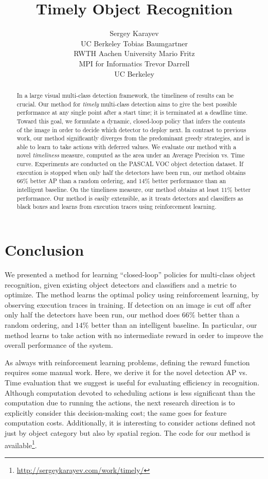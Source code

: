 \documentclass{article} %
\title{Timely Object Recognition}
\author{
Sergey Karayev \\
UC Berkeley
\And
Tobias Baumgartner \\
RWTH Aachen University
\And
Mario Fritz \\
MPI for Informatics 
\And
Trevor Darrell \\
UC Berkeley
}
\begin{document}
\maketitle

\begin{abstract}
In a large visual multi-class detection framework, the timeliness of results can be crucial.
Our method for \emph{timely} multi-class detection aims to give the best possible performance at any single point after a start time; it is terminated at a deadline time.
Toward this goal, we formulate a dynamic, closed-loop policy that infers the contents of the image in order to decide which detector to deploy next.
In contrast to previous work, our method significantly diverges from the predominant greedy strategies, and is able to learn to take actions with deferred values.
We evaluate our method with a novel \emph{timeliness} measure, computed as the area under an Average Precision vs. Time curve.
Experiments are conducted on the PASCAL VOC object detection dataset.
If execution is stopped when only half the detectors have been run, our method obtains $66\%$ better AP than a random ordering, and $14\%$ better performance than an intelligent baseline.
On the timeliness measure, our method obtains at least $11\%$ better performance.
Our method is easily extensible, as it treats detectors and classifiers as black boxes and learns from execution traces using reinforcement learning.
\end{abstract}






\pagebreak
\section{Conclusion}
\vspace{-.1in}
We presented a method for learning ``closed-loop'' policies for multi-class object recognition, given existing object detectors and classifiers and a metric to optimize.
The method learns the optimal policy using reinforcement learning, by observing execution traces in training.
If detection on an image is cut off after only half the detectors have been run, our method does $66\%$ better than a random ordering, and $14\%$ better than an intelligent baseline.
In particular, our method learns to take action with no intermediate reward in order to improve the overall performance of the system.

As always with reinforcement learning problems, defining the reward function requires some manual work.
Here, we derive it for the novel detection AP vs. Time evaluation that we suggest is useful for evaluating efficiency in recognition.
Although computation devoted to scheduling actions is less significant than the computation due to running the actions, the next research direction is to explicitly consider this decision-making cost; the same goes for feature computation costs.
Additionally, it is interesting to consider actions defined not just by object category but also by spatial region.
The code for our method is available\footnote{\url{http://sergeykarayev.com/work/timely/}}.
\end{document}

